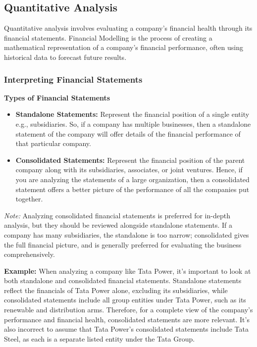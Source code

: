 \documentclass[12pt]{article}
\begin{document}
\subsection{Quantitative Analysis}

Quantitative analysis involves evaluating a company's financial health through its financial statements. Financial Modelling is the process of creating a mathematical representation of a company's financial performance, often using historical data to forecast future results.

\subsubsection{Interpreting Financial Statements}

\textbf{Types of Financial Statements}
\begin{itemize}
    \item \textbf{Standalone Statements:} Represent the financial position of a single entity e.g., subsidiaries.  So, if a company has multiple businesses, then a standalone statement of the company will offer details of the financial performance of that particular company.
    \item \textbf{Consolidated Statements:} Represent the financial position of the parent company along with its subsidiaries,  associates, or joint ventures. Hence, if you are analyzing the statements of a large organization, then a consolidated statement offers a better picture of the performance of all the companies put together.
\end{itemize}

\textit{Note:} Analyzing consolidated financial statements is preferred for in-depth analysis, but they should be reviewed alongside standalone statements. If a company has many subsidiaries, the standalone is too narrow; consolidated gives the full financial picture, and is generally preferred for evaluating the business comprehensively.

\textbf{Example:} When analyzing a company like Tata Power, it's important to look at both standalone and consolidated financial statements. Standalone statements reflect the financials of Tata Power alone, excluding its subsidiaries, while consolidated statements include all group entities under Tata Power, such as its renewable and distribution arms. Therefore, for a complete view of the company's performance and financial health, consolidated statements are more relevant. It's also incorrect to assume that Tata Power's consolidated statements include Tata Steel, as each is a separate listed entity under the Tata Group.
\end{document}
